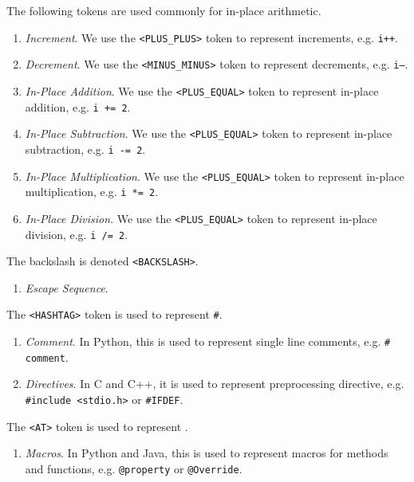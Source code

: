   \begin{example}
    The following tokens are used commonly for in-place arithmetic. 
    \begin{enumerate}
      \item \textit{Increment}. We use the \texttt{<PLUS\_PLUS>} token to represent increments, e.g. \texttt{i++}. 
      \item \textit{Decrement}. We use the \texttt{<MINUS\_MINUS>} token to represent decrements, e.g. \texttt{i--}. 
      \item \textit{In-Place Addition}. We use the \texttt{<PLUS\_EQUAL>} token to represent in-place addition, e.g. \texttt{i += 2}. 
      \item \textit{In-Place Subtraction}. We use the \texttt{<PLUS\_EQUAL>} token to represent in-place subtraction, e.g. \texttt{i -= 2}. 
      \item \textit{In-Place Multiplication}. We use the \texttt{<PLUS\_EQUAL>} token to represent in-place multiplication, e.g. \texttt{i *= 2}. 
      \item \textit{In-Place Division}. We use the \texttt{<PLUS\_EQUAL>} token to represent in-place division, e.g. \texttt{i /= 2}. 
    \end{enumerate}
  \end{example}
  
  \begin{example}[Backslash]
    The backslash is denoted \texttt{<BACKSLASH>}. 
    \begin{enumerate}
      \item \textit{Escape Sequence}. 
    \end{enumerate}
  \end{example}

  \begin{example}[Hashtag]
    The \texttt{<HASHTAG>} token is used to represent \texttt{\#}. 
    \begin{enumerate}
      \item \textit{Comment}. In Python, this is used to represent single line comments, e.g. \texttt{\# comment}. 
      \item \textit{Directives}. In C and C++, it is used to represent preprocessing directive, e.g. \texttt{\#include <stdio.h>} or \texttt{\#IFDEF}. 
    \end{enumerate}
  \end{example}

  \begin{example}[At]
    The \texttt{<AT>} token is used to represent \texttt{\@}. 
    \begin{enumerate}
      \item \textit{Macros}. In Python and Java, this is used to represent macros for methods and functions, e.g. \texttt{@property} or \texttt{@Override}. 
    \end{enumerate}
  \end{example}

